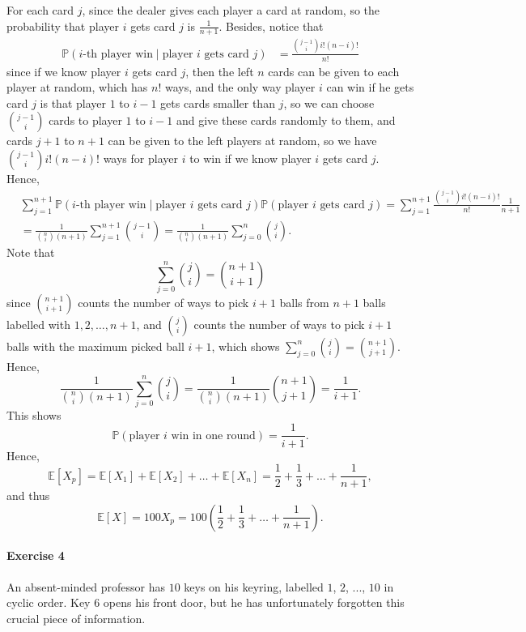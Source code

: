 \documentclass[a4paper,12pt]{article}
\begin{document}
For each card \(j\), since the dealer gives each player a card at random, so the probability that player \(i\) gets card \(j\) is \(\frac{1}{n+1}\). Besides, notice that 
\begin{align*}
	\mathbb{P} \left( i\text{-th player win} \mid \text{player } i \text{ gets card }j     \right) &= \frac{\binom{j-1}{i} i! (n-i)!}{n!} 
\end{align*}    
since if we know player \(i\) gets card \(j\), then the left \(n\) cards can be given to each player at random, which has \(n!\) ways, and the only way player \(i\) can win if he gets card \(j\) is that player \(1\) to \(i-1\) gets cards smaller than \(j\), so we can choose \(\binom{j-1}{i}\) cards to player \(1\) to \(i-1\) and give these cards randomly to them, and cards \(j+1\) to \(n+1\) can be given to the left players at random, so we have \(\binom{j-1}{i} i! (n-i)!\) ways for player \(i\) to win if we know player \(i\) gets card \(j\). Hence,
\begin{align*}
	&\sum_{j=1}^{n+1} \mathbb{P} \left( i\text{-th player win} \mid \text{player } i \text{ gets card }j     \right) \mathbb{P} \left( \text{player } i \text{ gets card } j   \right) = \sum_{j=1}^{n+1} \frac{\binom{j-1}{i} i! (n-i)!}{n!} \frac{1}{n+1} \\
	&= \frac{1}{\binom{n}{i} (n+1)}\sum_{j=1}^{n+1} \binom{j-1}{i} = \frac{1}{\binom{n}{i} (n+1)} \sum_{j=0}^n \binom{j}{i}.   
\end{align*}                  
Note that 
\[
	\sum_{j=0}^n \binom{j}{i} = \binom{n+1}{i+1} 
\]
since \(\binom{n+1}{i+1}\) counts the number of ways to pick \(i + 1\) balls from \(n + 1\) balls labelled with \(1, 2, \dots , n + 1\), and \(\binom{j}{i}\) counts the number of ways to pick \(i + 1\) balls with the maximum picked ball \(i+1\), which shows \(\sum_{j=0}^n \binom{j}{i} = \binom{n+1}{j+1}\). Hence,
\[
	\frac{1}{\binom{n}{i} (n+1)} \sum_{j=0}^n \binom{j}{i} = \frac{1}{\binom{n}{i} (n+1)} \binom{n+1}{j+1} = \frac{1}{i+1}. 
\]         
This shows 
\[
	\mathbb{P} (\text{player } i \text{ win in one round}  ) = \frac{1}{i+1}.
\]
Hence,
\[
	\mathbb{E} [X_p] = \mathbb{E} [X_1] + \mathbb{E} [X_2] + \dots + \mathbb{E} [X_n] =  \frac{1}{2} + \frac{1}{3} + \dots + \frac{1}{n + 1},
\]
and thus 
\[
	\mathbb{E} [X] = 100 X_p = 100 \left( \frac{1}{2} + \frac{1}{3} + \dots + \frac{1}{n+1} \right). 
\]

\newpage

\paragraph{Exercise 4}  An absent-minded professor has $10$ keys on his keyring, labelled $1$, $2$, ..., $10$ in cyclic order. Key $6$ opens his front door, but he has unfortunately forgotten this crucial piece of information.
\end{document}
